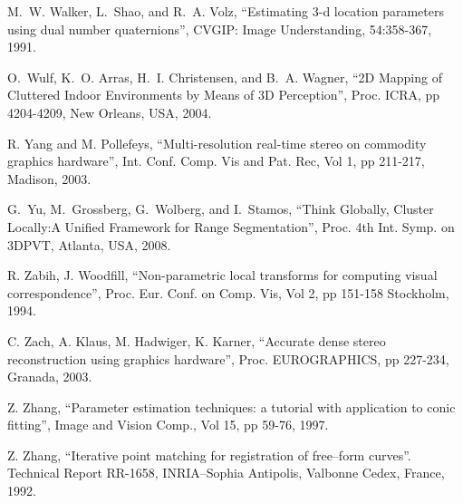 \documentclass[twocolumn,oneside]{book}
\begin{document}
\begin{thebibliography}{99}
M.~W. Walker, L.~Shao, and R.~A. Volz,
``Estimating 3-d location parameters using dual number quaternions'',
CVGIP: Image Understanding, 54:358-367, 1991.

O.~Wulf, K.~O. Arras, H.~I. Christensen, and B.~A. Wagner,
``{2D} {M}apping of {C}luttered {I}ndoor {E}nvironments by {M}eans of
  {3D} {P}erception'',
Proc. ICRA, pp 4204-4209, New Orleans, USA, 2004.

R. Yang and M. Pollefeys,
``Multi-resolution real-time stereo on commodity graphics hardware'',
Int. Conf. Comp. Vis and Pat. Rec, Vol 1, pp 211-217, Madison, 2003.

G.~Yu, M.~Grossberg, G.~Wolberg, and I.~Stamos,
``Think Globally, Cluster Locally:A Unified Framework for Range Segmentation'',
Proc. 4th Int. Symp. on 3DPVT, Atlanta, USA, 2008.

R. Zabih,  J. Woodfill,
``Non-parametric local transforms for computing visual correspondence'',
Proc. Eur. Conf. on Comp. Vis, Vol 2, pp 151-158 Stockholm, 1994.

C. Zach, A. Klaus, M. Hadwiger, K. Karner,
``Accurate dense stereo reconstruction using graphics hardware'',
Proc. EUROGRAPHICS, pp 227-234, Granada, 2003.

Z. Zhang,
``Parameter estimation techniques: a tutorial with application to conic fitting'',
Image and Vision Comp., Vol 15, pp 59-76, 1997.

Z. Zhang,
``Iterative point matching for registration of free--form curves''.
Technical Report RR-1658, INRIA--Sophia Antipolis, Valbonne Cedex, France,
1992.

\end{thebibliography}
\end{document}
